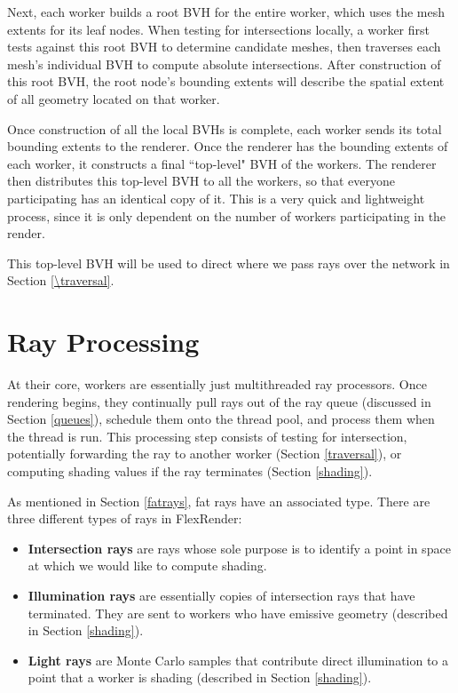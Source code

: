 \documentclass[12pt]{ucthesis}
\begin{document}
Next, each worker builds a root BVH for the entire worker, which uses the mesh
extents for its leaf nodes. When testing for intersections locally, a worker
first tests against this root BVH to determine candidate meshes, then traverses
each mesh's individual BVH to compute absolute intersections. After construction
of this root BVH, the root node's bounding extents will describe the spatial
extent of all geometry located on that worker.

Once construction of all the local BVHs is complete, each worker sends its
total bounding extents to the renderer. Once the renderer has the bounding
extents of each worker, it constructs a final ``top-level" BVH of the workers.
The renderer then distributes this top-level BVH to all the workers, so that
everyone participating has an identical copy of it. This is a very quick and
lightweight process, since it is only dependent on the number of workers
participating in the render.

This top-level BVH will be used to direct where we pass rays over the network
in Section \ref{\traversal}.

\section{Ray Processing}
\label{process}

At their core, workers are essentially just multithreaded ray processors. Once
rendering begins, they continually pull rays out of the ray queue (discussed in
Section \ref{queues}), schedule them onto the thread pool, and process them
when the thread is run. This processing step consists of testing for intersection,
potentially forwarding the ray to another worker (Section \ref{traversal}),
or computing shading values if the ray terminates (Section \ref{shading}).

As mentioned in Section \ref{fatrays}, fat rays have an associated type. There
are three different types of rays in FlexRender:

\begin{itemize}
   \item \textbf{Intersection rays} are rays whose sole purpose is to identify
      a point in space at which we would like to compute shading.
   \item \textbf{Illumination rays} are essentially copies of intersection
      rays that have terminated. They are sent to workers who have emissive
      geometry (described in Section \ref{shading}).
   \item \textbf{Light rays} are Monte Carlo samples that contribute direct
      illumination to a point that a worker is shading (described in Section
      \ref{shading}).
\end{itemize}
\end{document}
